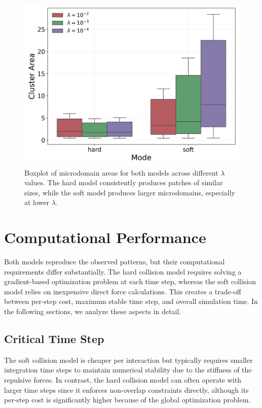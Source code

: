 \documentclass[conference]{IEEEtran}
\begin{document}
\begin{figure}
    \centering
    \includegraphics[width=\linewidth]{figures/comparison_plots/cluster_area_boxplot.png}
    \caption{Boxplot of microdomain areas for both models across different $\lambda$ values. The hard model consistently produces patches of similar sizes, while the soft model produces larger microdomains, especially at lower $\lambda$.}
    \label{fig:cluster_area_boxplot}
\end{figure}


\clearpage
\newpage



\section{Computational Performance}

Both models reproduce the observed patterns, but their computational requirements differ substantially. The hard collision model requires solving a gradient-based optimization problem at each time step, whereas the soft collision model relies on inexpensive direct force calculations. This creates a trade-off between per-step cost, maximum stable time step, and overall simulation time. In the following sections, we analyze these aspects in detail.

\subsection{Critical Time Step}

The soft collision model is cheaper per interaction but typically requires smaller integration time steps to maintain numerical stability due to the stiffness of the repulsive forces. In contrast, the hard collision model can often operate with larger time steps since it enforces non-overlap constraints directly, although its per-step cost is significantly higher because of the global optimization problem.
\end{document}
